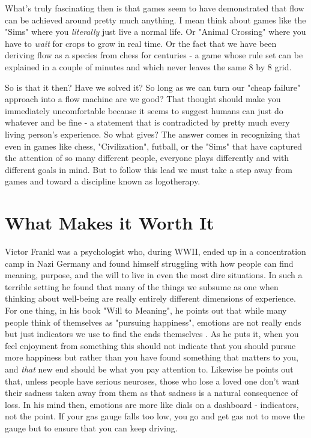 \documentclass[11pt]{book}
\begin{document}
What's truly fascinating then is that games seem to have demonstrated that flow can be achieved around pretty much anything. I mean think about games like the "Sims" where you \textit{literally} just live a normal life. Or "Animal Crossing" where you have to \textit{wait} for crops to grow in real time. Or the fact that we have been deriving flow as a species from chess for centuries - a game whose rule set can be explained in a couple of minutes and which never leaves the same 8 by 8 grid.
\newline

So is that it then? Have we solved it? So long as we can turn our "cheap failure" approach into a flow machine are we good? That thought should make you immediately uncomfortable because it seems to suggest humans can just do whatever and be fine - a statement that is contradicted by pretty much every living person's experience. So what gives? The answer comes in recognizing that even in games like chess, "Civilization", futball, or the "Sims" that have captured the attention of so many different people, everyone plays differently and with different goals in mind. But to follow this lead we must take a step away from games and toward a discipline known as logotherapy.

\section{What Makes it Worth It}
Victor Frankl was a psychologist who, during WWII, ended up in a concentration camp in Nazi Germany and found himself struggling with how people can find meaning, purpose, and the will to live in even the most dire situations. In such a terrible setting he found that many of the things we subsume as one when thinking about well-being are really entirely different dimensions of experience. For one thing, in his book "Will to Meaning", he points out that while many people think of themselves as "pursuing happiness", emotions are not really ends but just indicators we use to find the ends themselves \cite{frankl}. As he puts it, when you feel enjoyment from something this should not indicate that you should pursue more happiness but rather than you have found something that matters to you, and \textit{that} new end should be what you pay attention to. Likewise he points out that, unless people have serious neuroses, those who lose a loved one don't want their sadness taken away from them as that sadness is a natural consequence of loss. In his mind then, emotions are more like dials on a dashboard - indicators, not the point. If your gas gauge falls too low, you go and get gas not to move the gauge but to ensure that you can keep driving. 
\newline
\end{document}
